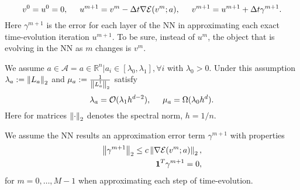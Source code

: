 \begin{equation}
	\label{eq:iterationschema_noisy_steepest_decent}
	v^0 = u^0 = 0,\hspace*{.5cm} u^{m+1} = v^m - \Delta t \nabla \mathcal{E}(v^m;a),\hspace*{.5cm} v^{m+1} = u^{m+1} + \Delta t \gamma^{m+1}.
\end{equation}
Here $\gamma^{m+1}$ is the error for each layer of the NN in approximating each exact time-evolution iteration $u^{m+1}$. To be sure, instead of $u^{m}$, the object that is evolving in the NN as $m$ changes is $v^m$.
\begin{assumption}
	We assume $a\in \mathscr{A} = {a\in \mathbb{R}^n \vert a_i \in [\lambda_{0}, \lambda_{1}], \forall i }$ with $\lambda_{0} > 0$. Under this assumption $\lambda_{a} := \left\lVert L_a\right\rVert_{2}$ and $\mu_a := \frac{1}{\left\lVert L_{a}^{\dag}\right\rVert_2}$ satisfy
	\begin{equation}
		\label{ass:lambda_a_properties}
		\lambda_{a} = \mathcal{O}(\lambda_{1} h^{d-2}), \hspace*{.5cm} \mu_a = \Omega(\lambda_{0} h^d).
	\end{equation}
	Here for matrices $\left\lVert\cdot\right\rVert_{2}$ denotes the spectral norm, $h=1/n$. 
\end{assumption}
\begin{assumption}
	We assume the NN results an approximation error term $\gamma^{m+1}$ with properties
	\begin{eqnarray}
		\label{ass:ass2}
		\left\lVert\gamma^{m+1}\right\rVert_{2} \leq c \left\lVert\nabla \mathcal{E}(v^m;a)\right\rVert_{2}, \\
		\textbf{1}^T \gamma^{m+1} = 0, 
	\end{eqnarray}
	for $m=0,\dots ,M-1$ when approximating each step of time-evolution.
\end{assumption}
